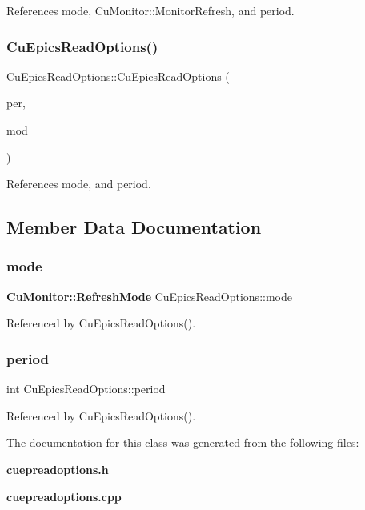 References mode, Cu\+Monitor\+::\+Monitor\+Refresh, and period.

\mbox{\label{classCuEpicsReadOptions_a400ad3c4dc95bed995b2ab07c939b1eb}} 
\subsubsection{Cu\+Epics\+Read\+Options()\hspace{0.1cm}{\footnotesize\ttfamily [2/2]}}
{\footnotesize\ttfamily Cu\+Epics\+Read\+Options\+::\+Cu\+Epics\+Read\+Options (\begin{DoxyParamCaption}\item[{int}]{per,  }\item[{\textbf{ Cu\+Monitor\+::\+Refresh\+Mode}}]{mod }\end{DoxyParamCaption})}



References mode, and period.



\subsection{Member Data Documentation}
\mbox{\label{classCuEpicsReadOptions_a5d89b8bae8dc8196563396104f867dbd}} 
\subsubsection{mode}
{\footnotesize\ttfamily \textbf{ Cu\+Monitor\+::\+Refresh\+Mode} Cu\+Epics\+Read\+Options\+::mode}



Referenced by Cu\+Epics\+Read\+Options().

\mbox{\label{classCuEpicsReadOptions_aeef25d2ce0802fa8c763863827710098}} 
\subsubsection{period}
{\footnotesize\ttfamily int Cu\+Epics\+Read\+Options\+::period}



Referenced by Cu\+Epics\+Read\+Options().



The documentation for this class was generated from the following files\+:\begin{DoxyCompactItemize}
\item 
\textbf{ cuepreadoptions.\+h}\item 
\textbf{ cuepreadoptions.\+cpp}\end{DoxyCompactItemize}

